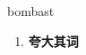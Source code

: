 
\begin{frame}
{\huge bombast}
\begin{center}
\begin{enumerate}\Large
  \item \textbf{夸大其词}
\end{enumerate}
\end{center}
\end{frame}
